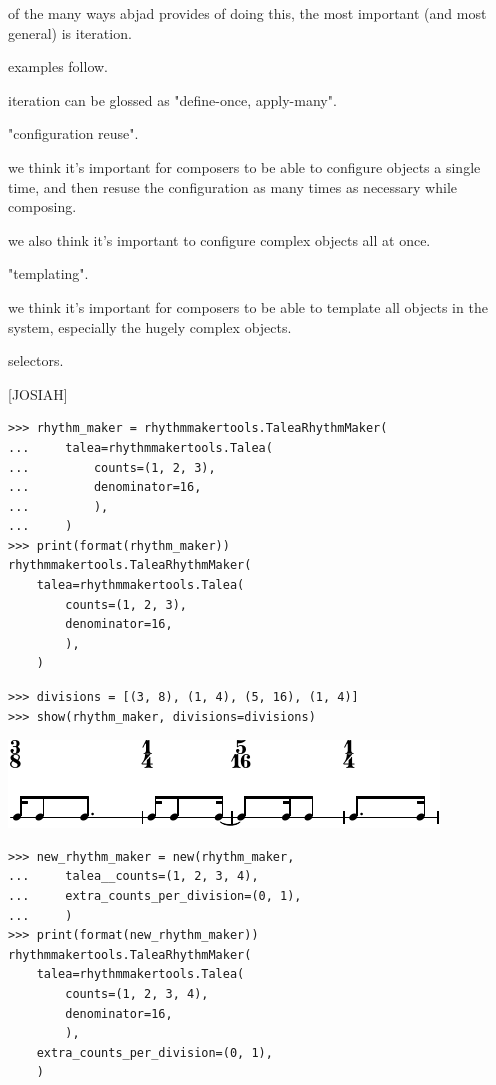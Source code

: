 \documentclass{article}
\begin{document}
of the many ways abjad provides of doing this, the most important (and most
general) is iteration.

examples follow.

iteration can be glossed as "define-once, apply-many".

"configuration reuse".

we think it's important for composers to be able to configure objects a single
time, and then resuse the configuration as many times as necessary while
composing.

we also think it's important to configure complex objects all at
once.

"templating".

we think it's important for composers to be able to template all objects in the
system, especially the hugely complex objects.

selectors.

[JOSIAH]

\begin{lstlisting}
>>> rhythm_maker = rhythmmakertools.TaleaRhythmMaker(
...     talea=rhythmmakertools.Talea(
...         counts=(1, 2, 3),
...         denominator=16,
...         ),
...     )
>>> print(format(rhythm_maker))
rhythmmakertools.TaleaRhythmMaker(
    talea=rhythmmakertools.Talea(
        counts=(1, 2, 3),
        denominator=16,
        ),
    )
\end{lstlisting}


\begin{lstlisting}
>>> divisions = [(3, 8), (1, 4), (5, 16), (1, 4)]
>>> show(rhythm_maker, divisions=divisions)
\end{lstlisting}

\noindent\includegraphics[scale=1.0]{images/abjad-12.pdf}


\begin{lstlisting}
>>> new_rhythm_maker = new(rhythm_maker,
...     talea__counts=(1, 2, 3, 4),
...     extra_counts_per_division=(0, 1),
...     )
>>> print(format(new_rhythm_maker))
rhythmmakertools.TaleaRhythmMaker(
    talea=rhythmmakertools.Talea(
        counts=(1, 2, 3, 4),
        denominator=16,
        ),
    extra_counts_per_division=(0, 1),
    )
\end{lstlisting}
\end{document}
